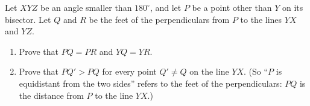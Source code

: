 Let $XYZ$ be an angle smaller than $180^\circ$, and let $P$ be a point other than $Y$ on its bisector. Let $Q$ and $R$ be the feet of the perpendiculars from $P$ to the lines $YX$ and $YZ$.
\begin{enumerate}
\item[(a)] Prove that $PQ=PR$ and $YQ=YR$.
\item[(b)] Prove that $PQ'>PQ$ for every point $Q'\ne Q$ on the line $YX$. (So ``$P$ is equidistant from the two sides'' refers to the feet of the perpendiculars: $PQ$ is the distance from $P$ to the line $YX$.)
\end{enumerate}
